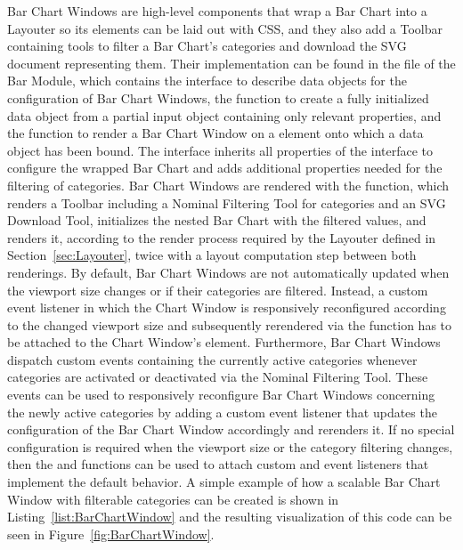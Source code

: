 Bar Chart Windows are high-level components that wrap a Bar Chart into
a Layouter so its elements can be laid out with CSS, and they also add
a Toolbar containing tools to filter a Bar Chart's categories and
download the SVG document representing them.  Their implementation can
be found in the  file of the Bar Module,
which contains the  interface to describe data
objects for the configuration of Bar Chart Windows, the
 function to create a fully initialized
 data object from a partial input object
containing only relevant properties, and the
 function to render a Bar Chart Window on a
 element onto which a  data object
has been bound.  The  interface inherits all
properties of the  interface to configure the wrapped
Bar Chart and adds additional properties needed for the filtering of
categories.  Bar Chart Windows are rendered with the
 function, which renders a Toolbar
including a Nominal Filtering Tool for categories and an SVG Download
Tool, initializes the nested Bar Chart with the filtered values, and
renders it, according to the render process required by the Layouter
defined in Section~\ref{sec:Layouter}, twice with a layout computation
step between both renderings.  By default, Bar Chart Windows are not
automatically updated when the viewport size changes or if their
categories are filtered.  Instead, a custom  event
listener in which the Chart Window is responsively reconfigured
according to the changed viewport size and subsequently rerendered via
the  function has to be attached to the
Chart Window's element.  Furthermore, Bar Chart Windows dispatch
custom  events containing the currently active
categories whenever categories are activated or deactivated via the
Nominal Filtering Tool.  These events can be used to responsively
reconfigure Bar Chart Windows concerning the newly active categories
by adding a custom  event listener that updates
the configuration of the Bar Chart Window accordingly and rerenders
it.  If no special configuration is required when the viewport size or
the category filtering changes, then the
 and
 functions can be used to
attach custom  and  event listeners
that implement the default behavior.  A simple example of how a
scalable Bar Chart Window with filterable categories can be created is
shown in Listing~\ref{list:BarChartWindow} and the resulting
visualization of this code can be seen in
Figure~\ref{fig:BarChartWindow}.



